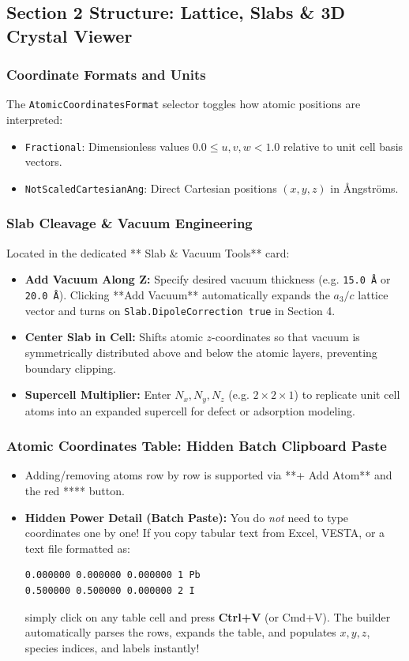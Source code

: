 \documentclass[11pt,a4paper]{article}
\begin{document}
\subsection{Section 2 Structure: Lattice, Slabs \& 3D Crystal Viewer}

\subsubsection{Coordinate Formats and Units}
The \texttt{AtomicCoordinatesFormat} selector toggles how atomic positions are interpreted:
\begin{itemize}[leftmargin=*]
 \item \texttt{Fractional}: Dimensionless values $0.0 \le u, v, w < 1.0$ relative to unit cell basis vectors.
 \item \texttt{NotScaledCartesianAng}: Direct Cartesian positions $(x, y, z)$ in \AA ngstr{\"o}ms.
\end{itemize}

\subsubsection{Slab Cleavage \& Vacuum Engineering}
Located in the dedicated ** Slab \& Vacuum Tools** card:
\begin{itemize}[leftmargin=*]
 \item \textbf{Add Vacuum Along Z:} Specify desired vacuum thickness (e.g. \texttt{15.0 \AA} or \texttt{20.0 \AA}). Clicking **Add Vacuum** automatically expands the $a_3 / c$ lattice vector and turns on \texttt{Slab.DipoleCorrection true} in Section 4.
 \item \textbf{Center Slab in Cell:} Shifts atomic $z$-coordinates so that vacuum is symmetrically distributed above and below the atomic layers, preventing boundary clipping.
 \item \textbf{Supercell Multiplier:} Enter $N_x, N_y, N_z$ (e.g. $2 \times 2 \times 1$) to replicate unit cell atoms into an expanded supercell for defect or adsorption modeling.
\end{itemize}

\subsubsection{Atomic Coordinates Table: Hidden Batch Clipboard Paste}
\begin{itemize}[leftmargin=*]
 \item Adding/removing atoms row by row is supported via **+ Add Atom** and the red **** button.
 \item \textbf{Hidden Power Detail (Batch Paste):} You do \textit{not} need to type coordinates one by one! If you copy tabular text from Excel, VESTA, or a text file formatted as:
\begin{verbatim}
0.000000 0.000000 0.000000 1 Pb
0.500000 0.500000 0.000000 2 I
\end{verbatim}
 simply click on any table cell and press \textbf{Ctrl+V} (or Cmd+V). The builder automatically parses the rows, expands the table, and populates $x, y, z$, species indices, and labels instantly!
\end{itemize}
\end{document}
